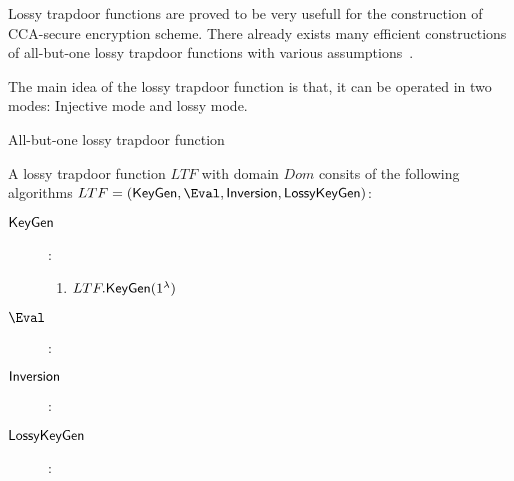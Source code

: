 Lossy trapdoor functions are proved to be very usefull for the construction of CCA-secure encryption scheme. 
There already exists many efficient constructions of all-but-one lossy trapdoor functions with various assumptions~\cite{DBLP:journals/siamcomp/PeikertW11, DBLP:conf/crypto/BoldyrevaFO08}.

The main idea of the lossy trapdoor function is that, it can be operated in two modes: Injective mode and lossy mode.

\begin{section}{All-but-one lossy trapdoor function}

  \begin{definition}
    A lossy trapdoor function $LTF$ with domain $Dom$ consits of the following algorithms $LTF = (\KeyGen, \Eval, \Inv, \LKeyGen)$:
    \begin{description}
    \item[${\mathsf{{\mathsf{KeyGen}}}}$] :
      \begin{enumerate}
        \item $LTF.{\mathsf{KeyGen}}(1^\lambda)$
      \end{enumerate}
    \item[${\mathsf{\Eval}}$] :
    \item[${\mathsf{{\mathsf{Inversion}}}}$] :
    \item[${\mathsf{{\mathsf{LossyKeyGen}}}}$] :
    \end{description}
  \end{definition}
\end{section}
